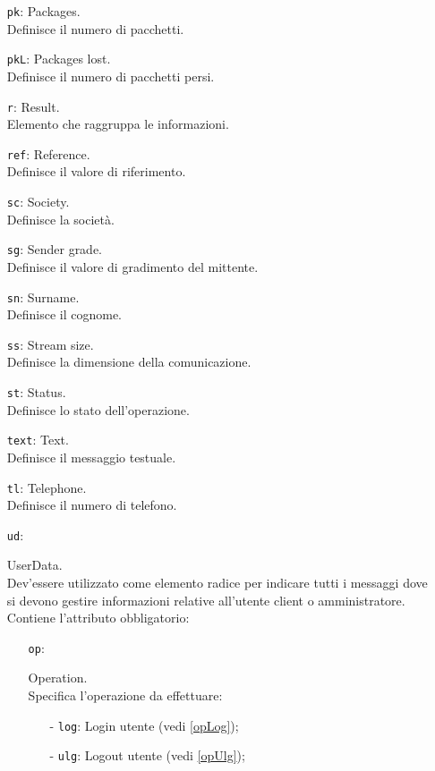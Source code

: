 {\begin{itemize}
{		Definisce la password.
		}
		\item[] \texttt{pk}:{ Packages.\\
		Definisce il numero di pacchetti.
		}
		\item[] \texttt{pkL}:{ Packages lost.\\
		Definisce il numero di pacchetti persi.
		}
		\item[] \texttt{r}:{ Result.\\
		Elemento che raggruppa le informazioni.
		}
		\item[] \texttt{ref}:{ Reference.\\
		Definisce il valore di riferimento.
		}
		\item[] \texttt{sc}:{ Society.\\
		Definisce la società.
		}
		\item[] \texttt{sg}:{ Sender grade.\\
		Definisce il valore di gradimento del mittente.
		}		
		\item[] \texttt{sn}:{ Surname.\\
		Definisce il cognome.
		}
		\item[] \texttt{ss}:{ Stream size.\\
		Definisce la dimensione della comunicazione.
		}
		\item[] \texttt{st}:{ Status.\\
		Definisce lo stato dell'operazione.
		}
		\item[] \texttt{text}:{ Text.\\
		Definisce il messaggio testuale.
		}
		\item[] \texttt{tl}:{ Telephone.\\
		Definisce il numero di telefono.
		}
		\item[] \texttt{ud}:{ UserData.\\
		Dev'essere utilizzato come elemento radice per indicare tutti i messaggi dove si devono gestire informazioni relative all'utente client o amministratore.\\
		Contiene l'attributo obbligatorio:
		\begin{itemize}
			\item[] \texttt{op}:{ Operation.\\
			Specifica l'operazione da effettuare:
				\begin{itemize}
					\item[-] \texttt{log}: Login utente (vedi \ref{opLog});
					\item[-] \texttt{ulg}: Logout utente (vedi \ref{opUlg});

\end{itemize}}
\end{itemize}}
\end{itemize}}
